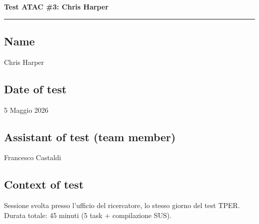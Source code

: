 ﻿\documentclass[11pt,a4paper]{article}
\begin{document}
\newpage
\begin{center}
  {\color{secondaryColor}\large\bfseries
  Test ATAC \#3: Chris Harper}\\
  \vspace{0.1cm}
  \color{borderColor}\hrule
\end{center}

\vspace{0.5cm}

\subsection*{Name}
\begin{tcolorbox}[base]
Chris Harper
\end{tcolorbox}

\subsection*{Date of test}
\begin{tcolorbox}[base]
5 Maggio 2026
\end{tcolorbox}

\subsection*{Assistant of test (team member)}
\begin{tcolorbox}[base]
Francesco Castaldi
\end{tcolorbox}

\subsection*{Context of test}
\begin{tcolorbox}[base]
Sessione svolta presso l'ufficio del ricercatore, lo stesso giorno del test TPER. Durata totale: 45 minuti (5 task + compilazione SUS).
\end{tcolorbox}
\end{document}

